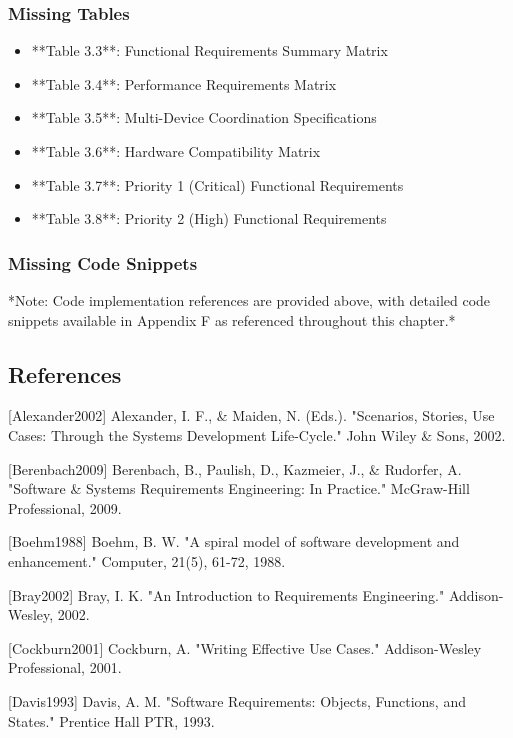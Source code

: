 \documentclass[12pt,a4paper]{article}
\begin{document}
\subsubsection{Missing Tables}

\begin{itemize}
\item **Table 3.3**: Functional Requirements Summary Matrix
\item **Table 3.4**: Performance Requirements Matrix
\item **Table 3.5**: Multi-Device Coordination Specifications
\item **Table 3.6**: Hardware Compatibility Matrix
\item **Table 3.7**: Priority 1 (Critical) Functional Requirements
\item **Table 3.8**: Priority 2 (High) Functional Requirements

\end{itemize}
\subsubsection{Missing Code Snippets}

*Note: Code implementation references are provided above, with detailed code snippets available in Appendix F as
referenced throughout this chapter.*

\subsection{References}

[Alexander2002] Alexander, I. F., \& Maiden, N. (Eds.). "Scenarios, Stories, Use Cases: Through the Systems Development
Life-Cycle." John Wiley \& Sons, 2002.

[Berenbach2009] Berenbach, B., Paulish, D., Kazmeier, J., \& Rudorfer, A. "Software \& Systems Requirements Engineering:
In Practice." McGraw-Hill Professional, 2009.

[Boehm1988] Boehm, B. W. "A spiral model of software development and enhancement." Computer, 21(5), 61-72, 1988.

[Bray2002] Bray, I. K. "An Introduction to Requirements Engineering." Addison-Wesley, 2002.

[Cockburn2001] Cockburn, A. "Writing Effective Use Cases." Addison-Wesley Professional, 2001.

[Davis1993] Davis, A. M. "Software Requirements: Objects, Functions, and States." Prentice Hall PTR, 1993.
\end{document}
